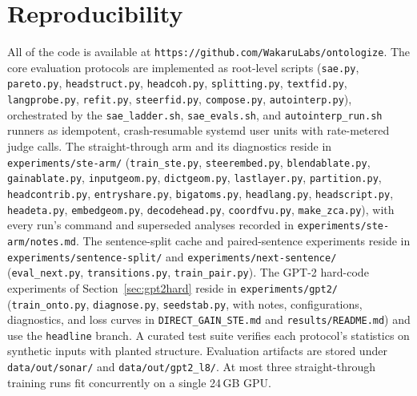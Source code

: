 \documentclass[11pt]{article}
\begin{document}




\section*{Reproducibility}

\begin{sloppypar}
All of the code is available at \texttt{https://github.com/\allowbreak WakaruLabs/ontologize}.
The core evaluation protocols are implemented as root-level scripts
(\texttt{sae.py}, \texttt{pareto.py}, \texttt{headstruct.py},
\texttt{headcoh.py}, \texttt{splitting.py}, \texttt{textfid.py},
\texttt{langprobe.py}, \texttt{refit.py}, \texttt{steerfid.py},
\texttt{compose.py}, \texttt{autointerp.py}), orchestrated by the
\texttt{sae\_ladder.sh}, \texttt{sae\_evals.sh}, and
\texttt{autointerp\_run.sh} runners as idempotent, crash-resumable systemd
user units with rate-metered judge calls. The straight-through arm and its
diagnostics reside in \texttt{experiments/ste-arm/}
(\texttt{train\_ste.py}, \texttt{steerembed.py}, \texttt{blendablate.py},
\texttt{gainablate.py}, \texttt{inputgeom.py}, \texttt{dictgeom.py},
\texttt{lastlayer.py}, \texttt{partition.py}, \texttt{headcontrib.py},
\texttt{entryshare.py}, \texttt{bigatoms.py}, \texttt{headlang.py},
\texttt{headscript.py}, \texttt{headeta.py}, \texttt{embedgeom.py},
\texttt{decodehead.py}, \texttt{coordfvu.py}, \texttt{make\_zca.py}), with
every run's command and superseded analyses recorded in
\texttt{experiments/ste-arm/notes.md}. The sentence-split cache and
paired-sentence experiments reside in \texttt{experiments/sentence-split/}
and \texttt{experiments/next-sentence/} (\texttt{eval\_next.py},
\texttt{transitions.py}, \texttt{train\_pair.py}). The GPT-2 hard-code
experiments of Section~\ref{sec:gpt2hard} reside in
\texttt{experiments/gpt2/} (\texttt{train\_onto.py}, \texttt{diagnose.py},
\texttt{seedstab.py}, with notes, configurations, diagnostics, and loss
curves in \texttt{DIRECT\_GAIN\_STE.md} and \texttt{results/README.md})
and use the \texttt{headline} branch. A curated test suite verifies each
protocol's statistics on synthetic inputs with planted structure.
Evaluation artifacts are stored under \texttt{data/out/sonar/} and
\texttt{data/out/gpt2\_l8/}. At most three straight-through training runs
fit concurrently on a single 24\,GB GPU.
\end{sloppypar}
\end{document}
